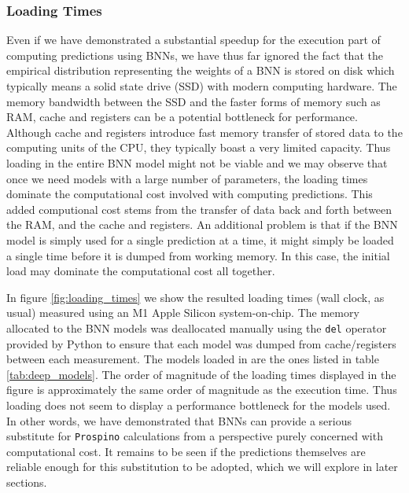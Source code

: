 \subsubsection{Loading Times}
Even if we have demonstrated a substantial speedup for the execution part of computing predictions using BNNs, we have thus far ignored the fact that the empirical distribution representing the weights of a BNN is stored on disk which typically means a solid state drive (SSD) with modern computing hardware. The memory bandwidth between the SSD and the faster forms of memory such as RAM, cache and registers can be a potential bottleneck for performance. Although cache and registers introduce fast memory transfer of stored data to the computing units of the CPU, they typically boast a very limited capacity. Thus loading in the entire BNN model might not be viable and we may observe that once we need models with a large number of parameters, the loading times dominate the computational cost involved with computing predictions. This added computional cost stems from the transfer of data back and forth between the RAM, and the cache and registers. An additional problem is that if the BNN model is simply used for a single prediction at a time, it might simply be loaded a single time before it is dumped from working memory. In this case, the initial load may dominate the computational cost all together. 

In figure \ref{fig:loading_times} we show the resulted loading times (wall clock, as usual) measured using an M1 Apple Silicon system-on-chip. The memory allocated to the BNN models was deallocated manually using the {\tt del} operator provided by Python to ensure that each model was dumped from cache/registers between each measurement. The models loaded in are the ones listed in table \ref{tab:deep_models}. The order of magnitude of the loading times displayed in the figure is approximately the same order of magnitude as the execution time. Thus loading does not seem to display a performance bottleneck for the models used. In other words, we have demonstrated that BNNs can provide a serious substitute for {\tt Prospino} calculations from a perspective purely concerned with computational cost. It remains to be seen if the predictions themselves are reliable enough for this substitution to be adopted, which we will explore in later sections.

